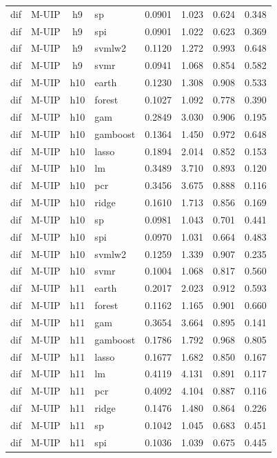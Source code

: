 \begin{ThreePartTable}
\begin{longtable}[t]{llclcccc}
dif & M-UIP & h9 & sp & 0.0901 & 1.023 & 0.624 & 0.348\\
dif & M-UIP & h9 & spi & 0.0901 & 1.022 & 0.623 & 0.369\\
dif & M-UIP & h9 & svmlw2 & 0.1120 & 1.272 & 0.993 & 0.648\\
dif & M-UIP & h9 & svmr & 0.0941 & 1.068 & 0.854 & 0.582\\
\addlinespace
dif & M-UIP & h10 & earth & 0.1230 & 1.308 & 0.908 & 0.533\\
dif & M-UIP & h10 & forest & 0.1027 & 1.092 & 0.778 & 0.390\\
dif & M-UIP & h10 & gam & 0.2849 & 3.030 & 0.906 & 0.195\\
dif & M-UIP & h10 & gamboost & 0.1364 & 1.450 & 0.972 & 0.648\\
dif & M-UIP & h10 & lasso & 0.1894 & 2.014 & 0.852 & 0.153\\
dif & M-UIP & h10 & lm & 0.3489 & 3.710 & 0.893 & 0.120\\
dif & M-UIP & h10 & pcr & 0.3456 & 3.675 & 0.888 & 0.116\\
dif & M-UIP & h10 & ridge & 0.1610 & 1.713 & 0.856 & 0.169\\
dif & M-UIP & h10 & sp & 0.0981 & 1.043 & 0.701 & 0.441\\
dif & M-UIP & h10 & spi & 0.0970 & 1.031 & 0.664 & 0.483\\
dif & M-UIP & h10 & svmlw2 & 0.1259 & 1.339 & 0.907 & 0.235\\
dif & M-UIP & h10 & svmr & 0.1004 & 1.068 & 0.817 & 0.560\\
\addlinespace
dif & M-UIP & h11 & earth & 0.2017 & 2.023 & 0.912 & 0.593\\
dif & M-UIP & h11 & forest & 0.1162 & 1.165 & 0.901 & 0.660\\
dif & M-UIP & h11 & gam & 0.3654 & 3.664 & 0.895 & 0.141\\
dif & M-UIP & h11 & gamboost & 0.1786 & 1.792 & 0.968 & 0.805\\
dif & M-UIP & h11 & lasso & 0.1677 & 1.682 & 0.850 & 0.167\\
dif & M-UIP & h11 & lm & 0.4119 & 4.131 & 0.891 & 0.117\\
dif & M-UIP & h11 & pcr & 0.4092 & 4.104 & 0.887 & 0.116\\
dif & M-UIP & h11 & ridge & 0.1476 & 1.480 & 0.864 & 0.226\\
dif & M-UIP & h11 & sp & 0.1042 & 1.045 & 0.683 & 0.451\\
dif & M-UIP & h11 & spi & 0.1036 & 1.039 & 0.675 & 0.445\\

\end{longtable}
\end{ThreePartTable}

